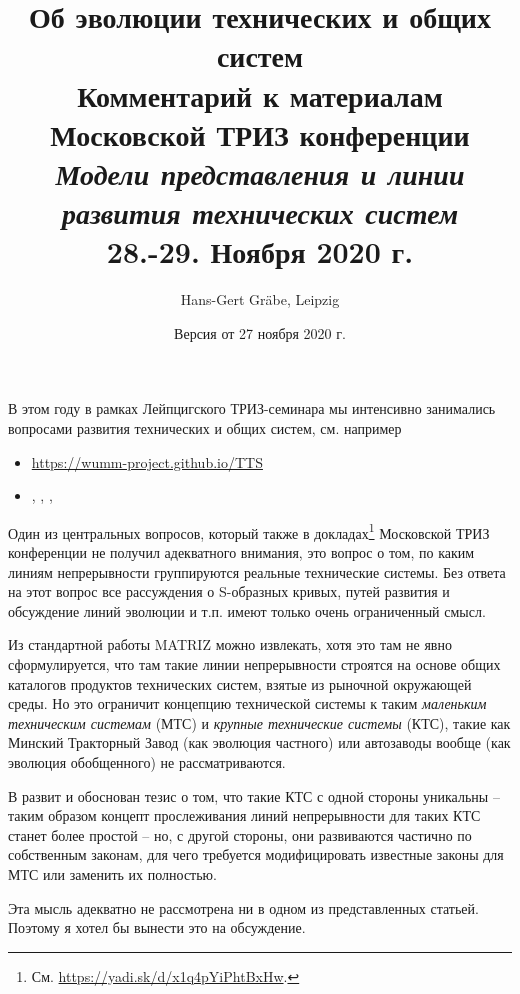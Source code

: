 \documentclass[11pt,a4paper]{article}
\title{Об эволюции технических и общих систем\\[1em] \Large Комментарий к
  материалам Московской ТРИЗ конференции\\ \emph{Модели представления и линии
    развития технических систем}\\ 28.-29. Ноября 2020 г.}
\author{Hans-Gert Gräbe, Leipzig}
\date{Версия от 27 ноября 2020 г.}
\begin{document}
\maketitle

В этом году в рамках Лейпцигского ТРИЗ-семинара мы интенсивно занимались
вопросами развития технических и общих систем, см. например
\begin{itemize}[noitemsep]
\item \url{https://wumm-project.github.io/TTS}
\item \cite{Graebe2020a}, \cite{Graebe2020b}, \cite{Graebe2020c},
  \cite{Graebe2020d}
\end{itemize}

Один из центральных вопросов, который также в
докладах\footnote{См. \url{https://yadi.sk/d/x1q4pYiPhtBxHw}.}  Московской
ТРИЗ конференции не получил адекватного внимания, это вопрос о том, по каким
линиям непрерывности группируются реальные технические системы.  Без ответа на
этот вопрос все рассуждения о S-образных кривых, путей развития и обсуждение
линий эволюции и т.п. имеют только очень ограниченный смысл.

Из стандартной работы MATRIZ \cite{TESE2018} можно извлекать, хотя это там не
явно сформулируется, что там такие линии непрерывности строятся на основе
общих каталогов продуктов технических систем, взятые из рыночной окружающей
среды.  Но это ограничит концепцию технической системы к таким \emph{маленьким
  техническим системам} (МТС) и \emph{крупные технические системы} (КТС),
такие как Минский Тракторный Завод (как эволюция частного) или автозаводы
вообще (как эволюция обобщенного) не рассматриваются.

В \cite{Graebe2020b} развит и обоснован тезис о том, что такие КТС с одной
стороны уникальны -- таким образом концепт прослеживания линий непрерывности
для таких КТС станет более простой -- но, с другой стороны, они развиваются
частично по собственным законам, для чего требуется модифицировать известные
законы для МТС или заменить их полностью.

Эта мысль адекватно не рассмотрена ни в одном из представленных статьей.
Поэтому я хотел бы вынести это на обсуждение.
\end{document}
